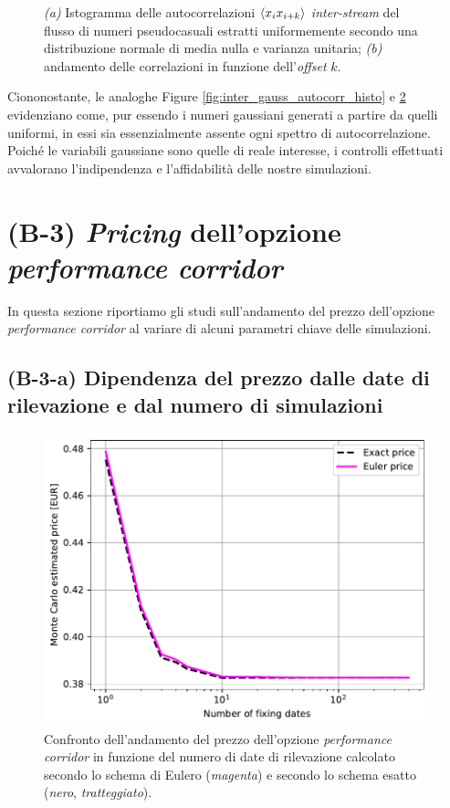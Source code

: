 \begin{figure}[t]
\begin{subfigure}{.5\textwidth}
  \caption{}
  \label{fig:inter_gauss_autocorr_offset}
\end{subfigure}
\caption{\textit{(a)} Istogramma delle autocorrelazioni $\braket{x_i x_{i+k}}$ \textit{inter-stream} del flusso di numeri pseudocasuali estratti uniformemente secondo una distribuzione normale di media nulla e varianza unitaria; \textit{(b)} andamento delle correlazioni in funzione dell'\textit{offset} $k$.}
\end{figure}

Ciononostante, le analoghe Figure \ref{fig:inter_gauss_autocorr_histo} e \ref{fig:inter_gauss_autocorr_offset} evidenziano come, pur essendo i numeri gaussiani generati a partire da quelli uniformi, in essi sia essenzialmente assente ogni spettro di autocorrelazione. Poiché le variabili gaussiane sono quelle di reale interesse, i controlli effettuati avvalorano l'indipendenza e l'affidabilità delle nostre simulazioni.

\section{(B-3) \textit{Pricing} dell'opzione \textit{performance corridor}} \label{sec:pc_pricing}
In questa sezione riportiamo gli studi sull'andamento del prezzo dell'opzione \textit{performance corridor} al variare di alcuni parametri chiave delle simulazioni.

\subsection{(B-3-a) Dipendenza del prezzo dalle date di rilevazione e dal numero di simulazioni}

\begin{figure}[t]
    \centering
    \includegraphics[scale=0.5]{graphs/OptionPriceVsM_PriceVsM_N100mln.pdf}
    \caption{Confronto dell'andamento del prezzo dell'opzione \textit{performance corridor} in funzione del numero di date di rilevazione calcolato secondo lo schema di Eulero (\textit{magenta}) e secondo lo schema esatto (\textit{nero}, \textit{tratteggiato}).}
    \label{fig:exactvseuler_M}
\end{figure}

